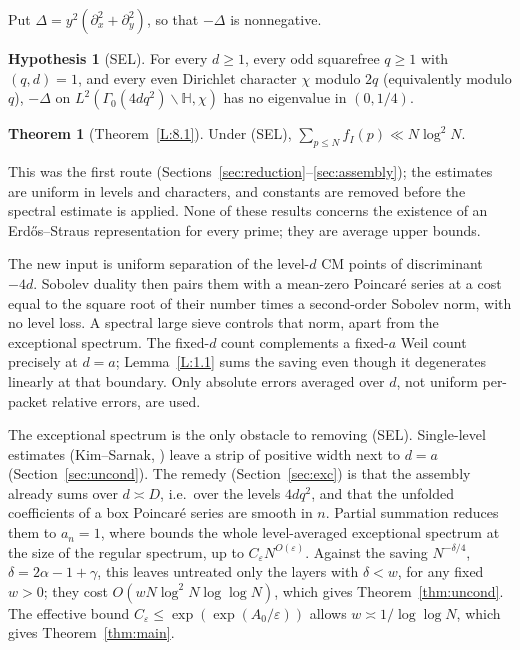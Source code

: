 \documentclass[10pt,reqno]{amsart}
\theoremstyle{definition}
\newtheorem{hypothesis}[theorem]{Hypothesis}
\newtheorem*{theorem*}{Theorem}
\numberwithin{equation}{section}
\newcommand{\HH}{\mathbb H}
\begin{document}
Put $\Delta=y^2(\partial_x^2+\partial_y^2)$, so that $-\Delta$ is nonnegative.
\begin{hypothesis}[SEL]\label{hyp:sel}
For every $d\ge1$, every odd squarefree $q\ge1$ with $(q,d)=1$, and every
even Dirichlet character $\chi$ modulo $2q$ (equivalently modulo $q$),
$-\Delta$ on $L^2(\Gamma_0(4dq^2)\backslash\HH,\chi)$ has no eigenvalue in
$(0,1/4)$.
\end{hypothesis}
\begin{theorem*}[Theorem~\ref{L:8.1}]
Under \textup{(SEL)}, $\sum_{p\le N}f_I(p)\ll N\log^2N$.
\end{theorem*}
This was the first route (Sections~\ref{sec:reduction}--\ref{sec:assembly}); the
estimates are uniform in levels and characters, and constants are removed
before the spectral estimate is applied. None of these results concerns the
existence of an Erd\H{o}s--Straus representation for every prime; they are
average upper bounds.

The new input is uniform separation of the level-$d$ CM points of
discriminant $-4d$. Sobolev duality then pairs them with a mean-zero
Poincar\'e series at a cost equal to the square root of their number times
a second-order Sobolev norm, with no level loss. A spectral large sieve
controls that norm, apart from the exceptional spectrum. The fixed-$d$
count complements a fixed-$a$ Weil count precisely at $d=a$;
Lemma~\ref{L:1.1} sums the saving even though it degenerates linearly at
that boundary. Only absolute errors averaged over $d$, not uniform
per-packet relative errors, are used.

The exceptional spectrum is the only obstacle to removing (SEL).
Single-level estimates (Kim--Sarnak, \cite[Theorem~5]{DI}) leave a
strip of positive width next to $d=a$ (Section~\ref{sec:uncond}). The
remedy (Section~\ref{sec:exc}) is that the assembly already sums over
$d\asymp D$, i.e.\ over the levels $4dq^2$, and that the unfolded
coefficients of a box Poincar\'e series are smooth in $n$. Partial
summation reduces them to $a_n=1$, where \cite[Theorem~7]{DI} bounds the
whole level-averaged exceptional spectrum at the size of the regular
spectrum, up to $C_\varepsilon N^{O(\varepsilon)}$. Against the saving
$N^{-\delta/4}$, $\delta=2\alpha-1+\gamma$, this leaves untreated only the
layers with $\delta<w$, for any fixed $w>0$; they cost
$O(wN\log^2N\log\log N)$, which gives Theorem~\ref{thm:uncond}. The
effective bound $C_\varepsilon\le\exp(\exp(A_0/\varepsilon))$ allows
$w\asymp1/\log\log N$, which gives Theorem~\ref{thm:main}.
\end{document}
